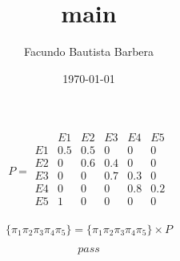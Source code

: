 \documentclass{article}
\title{main}
\author{Facundo Bautista Barbera}
\date{\today}
\begin{document}
\maketitle

$$
	P =
	\begin{array}{c|ccccc}
		   & E1  & E2  & E3  & E4  & E5  \\
		\hline
		E1 & 0.5 & 0.5 & 0   & 0   & 0   \\
		E2 & 0   & 0.6 & 0.4 & 0   & 0   \\
		E3 & 0   & 0   & 0.7 & 0.3 & 0   \\
		E4 & 0   & 0   & 0   & 0.8 & 0.2 \\
		E5 & 1   & 0   & 0   & 0   & 0   \\
	\end{array}
$$


$$
	\{\pi_1 \pi_2 \pi_3 \pi_4 \pi_5\} = \{\pi_1 \pi_2 \pi_3 \pi_4 \pi_5\} \times P
$$

$$
	pass
$$
\end{document}
